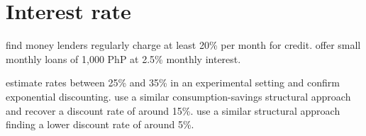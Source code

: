 \documentclass[12pt]{article}
\begin{document}
\section{Interest rate}



\cite{karlan2009expanding} find money lenders regularly charge at least 20\% per month for credit.  \cite{gine2014group} offer small monthly loans of 1,000 PhP at 2.5\% monthly interest.

\cite{andreoni2012estimating} estimate rates between 25\% and 35\% in an experimental setting and confirm exponential discounting.  \cite{laibson2007estimating} use a similar consumption-savings structural approach and recover a discount rate of around 15\%.  \cite{gourinchas2002consumption} use a similar structural approach finding a lower discount rate of around 5\%.







\nocite{*}
\singlespacing
\setlength{\bibsep}{7pt}


\end{document}
